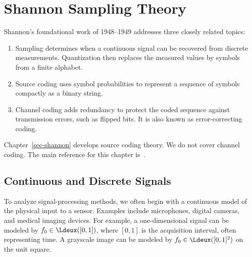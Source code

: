 
\chapter{Shannon Sampling Theory}
\label{sec-shannon-sampling}


%
Shannon's foundational work of 1948--1949 addresses three closely related topics:
\begin{enumerate}
	\item Sampling determines when a continuous signal can be recovered from discrete measurements. Quantization then replaces the measured values by symbols from a finite alphabet.
	\item Source coding uses symbol probabilities to represent a sequence of symbols compactly as a binary string.
	\item Channel coding adds redundancy to protect the coded sequence against transmission errors, such as flipped bits. It is also known as error-correcting coding.
\end{enumerate}
%
Chapter~\ref{sec-shannon} develops source coding theory. We do not cover channel coding.
%
The main reference for this chapter is~\cite{mallat2008wavelet}.


\section{Continuous and Discrete Signals}

To analyze signal-processing methods, we often begin with a continuous model of the physical input to a sensor.
%
Examples include microphones, digital cameras, and medical imaging devices.
%
For example, a one-dimensional signal can be modeled by $f_0\in\Ldeux([0,1])$, where $[0,1]$ is the acquisition interval, often representing time. A grayscale image can be modeled by $f_0\in\Ldeux([0,1]^2)$ on the unit square.

